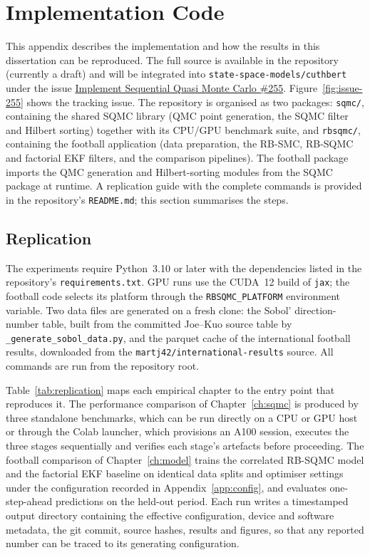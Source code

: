 \chapter{Implementation Code}
\label{app:code}

This appendix describes the implementation and how the results in this dissertation can be reproduced. The full source is available in the repository \texttt{} (currently a draft) and will be integrated into \texttt{state-space-models/cuthbert} under the issue \href{https://github.com/state-space-models/cuthbert/issues/255}{Implement Sequential Quasi Monte Carlo \#255}. Figure~\ref{fig:issue-255} shows the tracking issue. The repository is organised as two packages: \texttt{sqmc/}, containing the shared SQMC library (QMC point generation, the SQMC filter and Hilbert sorting) together with its CPU/GPU benchmark suite, and \texttt{rbsqmc/}, containing the football application (data preparation, the RB-SMC, RB-SQMC and factorial EKF filters, and the comparison pipelines). The football package imports the QMC generation and Hilbert-sorting modules from the SQMC package at runtime. A replication guide with the complete commands is provided in the repository's \texttt{README.md}; this section summarises the steps.

\section{Replication}
\label{app:replication}

The experiments require Python~3.10 or later with the dependencies listed in the repository's \texttt{requirements.txt}. GPU runs use the CUDA~12 build of \texttt{jax}; the football code selects its platform through the \texttt{RBSQMC\_PLATFORM} environment variable. Two data files are generated on a fresh clone: the Sobol' direction-number table, built from the committed Joe--Kuo source table by \texttt{\_generate\_sobol\_data.py}, and the parquet cache of the international football results, downloaded from the \texttt{martj42/international-results} source. All commands are run from the repository root.

Table~\ref{tab:replication} maps each empirical chapter to the entry point that reproduces it. The performance comparison of Chapter~\ref{ch:sqmc} is produced by three standalone benchmarks, which can be run directly on a CPU or GPU host or through the Colab launcher, which provisions an A100 session, executes the three stages sequentially and verifies each stage's artefacts before proceeding. The football comparison of Chapter~\ref{ch:model} trains the correlated RB-SQMC model and the factorial EKF baseline on identical data splits and optimiser settings under the configuration recorded in Appendix~\ref{app:config}, and evaluates one-step-ahead predictions on the held-out period. Each run writes a timestamped output directory containing the effective configuration, device and software metadata, the git commit, source hashes, results and figures, so that any reported number can be traced to its generating configuration.

